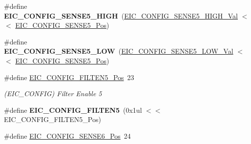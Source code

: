 \begin{DoxyCompactItemize}
\item 
\hypertarget{group___s_a_m_l21___e_i_c_ga2444c739cc4da9c4da66e9b43c8eb75d}{}\#define {\bfseries E\+I\+C\+\_\+\+C\+O\+N\+F\+I\+G\+\_\+\+S\+E\+N\+S\+E5\+\_\+\+H\+I\+G\+H}~(\hyperlink{group___s_a_m_l21___e_i_c_gafc521f838a152ea846c8ba29d2d7e578}{E\+I\+C\+\_\+\+C\+O\+N\+F\+I\+G\+\_\+\+S\+E\+N\+S\+E5\+\_\+\+H\+I\+G\+H\+\_\+\+Val}    $<$$<$ \hyperlink{group___s_a_m_l21___e_i_c_gace7caae074bf08e88805b591c626fb7f}{E\+I\+C\+\_\+\+C\+O\+N\+F\+I\+G\+\_\+\+S\+E\+N\+S\+E5\+\_\+\+Pos})\label{group___s_a_m_l21___e_i_c_ga2444c739cc4da9c4da66e9b43c8eb75d}

\item 
\hypertarget{group___s_a_m_l21___e_i_c_gaf861de0eab75083882db5df50f0330c8}{}\#define {\bfseries E\+I\+C\+\_\+\+C\+O\+N\+F\+I\+G\+\_\+\+S\+E\+N\+S\+E5\+\_\+\+L\+O\+W}~(\hyperlink{group___s_a_m_l21___e_i_c_ga4a2958b65315240e85c9bf06c9c92305}{E\+I\+C\+\_\+\+C\+O\+N\+F\+I\+G\+\_\+\+S\+E\+N\+S\+E5\+\_\+\+L\+O\+W\+\_\+\+Val}     $<$$<$ \hyperlink{group___s_a_m_l21___e_i_c_gace7caae074bf08e88805b591c626fb7f}{E\+I\+C\+\_\+\+C\+O\+N\+F\+I\+G\+\_\+\+S\+E\+N\+S\+E5\+\_\+\+Pos})\label{group___s_a_m_l21___e_i_c_gaf861de0eab75083882db5df50f0330c8}

\item 
\hypertarget{group___s_a_m_l21___e_i_c_gab3c6837a90614cf79a4d0feece41fdd6}{}\#define \hyperlink{group___s_a_m_l21___e_i_c_gab3c6837a90614cf79a4d0feece41fdd6}{E\+I\+C\+\_\+\+C\+O\+N\+F\+I\+G\+\_\+\+F\+I\+L\+T\+E\+N5\+\_\+\+Pos}~23\label{group___s_a_m_l21___e_i_c_gab3c6837a90614cf79a4d0feece41fdd6}

\begin{DoxyCompactList}\small\item\em (E\+I\+C\+\_\+\+C\+O\+N\+F\+I\+G) Filter Enable 5 \end{DoxyCompactList}\item 
\hypertarget{group___s_a_m_l21___e_i_c_ga01928d66cdcdba5ec3176653d2b3ea2a}{}\#define {\bfseries E\+I\+C\+\_\+\+C\+O\+N\+F\+I\+G\+\_\+\+F\+I\+L\+T\+E\+N5}~(0x1ul $<$$<$ E\+I\+C\+\_\+\+C\+O\+N\+F\+I\+G\+\_\+\+F\+I\+L\+T\+E\+N5\+\_\+\+Pos)\label{group___s_a_m_l21___e_i_c_ga01928d66cdcdba5ec3176653d2b3ea2a}

\item 
\hypertarget{group___s_a_m_l21___e_i_c_ga17d194da98be0777ff750650293d386d}{}\#define \hyperlink{group___s_a_m_l21___e_i_c_ga17d194da98be0777ff750650293d386d}{E\+I\+C\+\_\+\+C\+O\+N\+F\+I\+G\+\_\+\+S\+E\+N\+S\+E6\+\_\+\+Pos}~24\label{group___s_a_m_l21___e_i_c_ga17d194da98be0777ff750650293d386d}


\end{DoxyCompactItemize}
